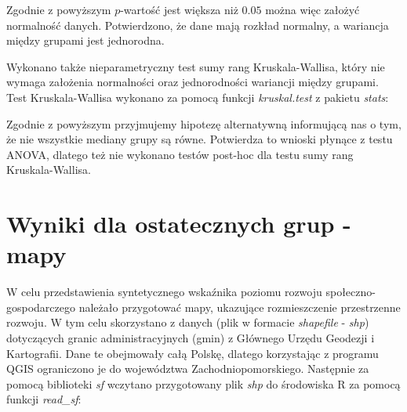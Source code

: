 \documentclass{amuthesis}
\begin{document}
Zgodnie z powyższym \(p\)-wartość jest większa niż \(0.05\) można więc założyć normalność danych.
Potwierdzono, że dane mają rozkład normalny, a wariancja między grupami jest jednorodna.

Wykonano także nieparametryczny test sumy rang Kruskala-Wallisa, który nie wymaga założenia normalności oraz jednorodności wariancji między grupami.
Test Kruskala-Wallisa wykonano za pomocą funkcji \emph{kruskal.test} z pakietu \emph{stats}:

\begin{Shaded}
\begin{Highlighting}[]
\SpecialCharTok{::}\SpecialCharTok{$}\SpecialCharTok{\textasciitilde{}}\SpecialCharTok{$}
\CommentTok{\#\textgreater{} }
\CommentTok{\#\textgreater{} }
\end{Highlighting}
\end{Shaded}

Zgodnie z powyższym przyjmujemy hipotezę alternatywną informującą nas o tym, że nie wszystkie mediany grupy są równe. Potwierdza to wnioski płynące z testu ANOVA, dlatego też nie wykonano testów post-hoc dla testu sumy rang Kruskala-Wallisa.

\hypertarget{mapy}{%
\section{Wyniki dla ostatecznych grup -mapy}\label{mapy}}

W celu przedstawienia syntetycznego wskaźnika poziomu rozwoju społeczno-gospodarczego należało przygotować mapy, ukazujące rozmieszczenie przestrzenne rozwoju.
W tym celu skorzystano z danych (plik w formacie \emph{shapefile} - \emph{shp}) dotyczących granic administracyjnych (gmin) z Głównego Urzędu Geodezji i Kartografii.
Dane te obejmowały całą Polskę, dlatego korzystając z programu QGIS ograniczono je do województwa Zachodniopomorskiego.
Następnie za pomocą biblioteki \emph{sf} wczytano przygotowany plik \emph{shp} do środowiska R za pomocą funkcji \emph{read\_sf}:

\begin{Shaded}
\begin{Highlighting}[]
\OtherTok{\textless{}{-}}\SpecialCharTok{::}\NormalTok{(}\NormalTok{)}
\end{Highlighting}
\end{Shaded}
\end{document}
